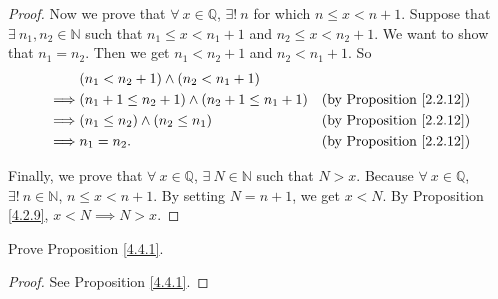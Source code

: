 \begin{proof}
Now we prove that \(\forall\ x \in \mathds{Q}\), \(\exists!\ n\) for which \(n \leq x < n + 1\).
Suppose that \(\exists\ n_1, n_2 \in \mathds{N}\) such that \(n_1 \leq x < n_1 + 1\) and \(n_2 \leq x < n_2 + 1\).
We want to show that \(n_1 = n_2\).
Then we get \(n_1 < n_2 + 1\) and \(n_2 < n_1 + 1\).
So
\begin{align*}
& (n_1 < n_2 + 1) \land (n_2 < n_1 + 1) \\
\implies & (n_1 + 1 \leq n_2 + 1) \land (n_2 + 1 \leq n_1 + 1) & \text{(by Proposition \ref{2.2.12})} \\
\implies & (n_1 \leq n_2) \land (n_2 \leq n_1) & \text{(by Proposition \ref{2.2.12})} \\
\implies & n_1 = n_2. & \text{(by Proposition \ref{2.2.12})}
\end{align*}

Finally, we prove that \(\forall\ x \in \mathds{Q}\), \(\exists\ N \in \mathds{N}\) such that \(N > x\).
Because \(\forall\ x \in \mathds{Q}\), \(\exists!\ n \in \mathds{N}\), \(n \leq x < n + 1\).
By setting \(N = n + 1\), we get \(x < N\).
By Proposition \ref{4.2.9}, \(x < N \implies N > x\).
\end{proof}

\exercisesection

\begin{exercise}\label{ex 4.4.1}
Prove Proposition \ref{4.4.1}.
\end{exercise}

\begin{proof}
See Proposition \ref{4.4.1}.
\end{proof}